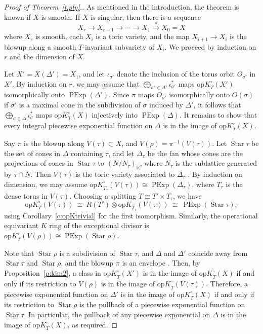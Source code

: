 \documentclass[11pt]{amsart}
\theoremstyle{definition}
\begin{document}
\begin{proof}[Proof of Theorem~\ref{t:plp}.]
As mentioned in the introduction, the theorem is known if $X$ is smooth.  If $X$ is singular, then there is a sequence
\[
  X_r \rightarrow X_{r-1} \rightarrow \cdots \rightarrow X_1  \stackrel{\pi}{\rightarrow} X_0 = X
\]
where $X_r$ is smooth, each $X_i$ is a toric variety, and the map $X_{i + 1} \rightarrow X_i$ is the blowup along a smooth $T$-invariant subvariety of $X_i$.  We proceed by induction on $r$ and the dimension of $X$.

Let $X' = X(\Delta') = X_1$, and let $\iota_{\sigma'}$ denote the inclusion of the torus orbit $O_{\sigma'}$ in $X'$.  By induction on $r$, we may assume that $\bigoplus_{\sigma' \in \Delta'} \iota_{\sigma'}^*$ maps ${\mathrm{op}K}_T^\circ(X')$ isomorphically onto $\operatorname{PExp}(\Delta')$.  Since $\pi$ maps $O_{\sigma'}$ isomorphically onto $O(\sigma)$ if $\sigma'$ is a maximal cone in the subdivision of $\sigma$ induced by $\Delta'$, it follows that $\bigoplus_{\sigma \in \Delta} \iota_\sigma^*$ maps ${\mathrm{op}K}_T^\circ(X)$ injectively into $\operatorname{PExp}(\Delta)$.  It remains to show that every integral piecewise exponential function on $\Delta$ is in the image of ${\mathrm{op}K}_T^\circ(X)$.

Say $\pi$ is the blowup along $V(\tau) \subset X$, and $V(\rho) = \pi^{-1} (V(\tau))$.  Let $\operatorname{Star} \tau$ be the set of cones in $\Delta$ containing $\tau$, and let $\Delta_\tau$ be the fan whose cones are the projections of cones in $\operatorname{Star} \tau$ to $(N / N_\tau)_{\mathbb{R}}$, where $N_\tau$ is the sublattice generated by $\tau \cap N$.  Then $V(\tau)$ is the toric variety associated to $\Delta_\tau$ \cite[Section 3.1]{Fulton}.  By induction on dimension, we may assume ${\mathrm{op}K}_{T_\tau}^\circ(V(\tau)) \cong \operatorname{PExp}(\Delta_\tau)$, where $T_\tau$ is the dense torus in $V(\tau)$.  Choosing a splitting $T \cong T'\times T_\tau$, we have
\[
{\mathrm{op}K}_T^\circ(V(\tau)) \ \cong \ R(T') \otimes {\mathrm{op}K}_{T_\tau}(V(\tau)) \ \cong \ \operatorname{PExp}(\operatorname{Star} \tau),
\]
using Corollary~\ref{c:opKtrivial} for the first isomorphism.  
Similarly, the operational equivariant $K$ ring of the exceptional divisor is ${\mathrm{op}K}_T^\circ(V(\rho)) \cong \operatorname{PExp}(\operatorname{Star} \rho)$.

Note that $\operatorname{Star} \rho$ is a subdivision of $\operatorname{Star} \tau$, and $\Delta$ and $\Delta'$ coincide away from $\operatorname{Star} \tau$ and $\operatorname{Star} \rho$, and the blowup $\pi$ is an envelope \cite[Lemma~1]{chow}.  Then, by Proposition~\ref{p:kim2}, a class in ${\mathrm{op}K}_T^\circ(X')$ is in the image of ${\mathrm{op}K}_T^\circ(X)$ if and only if  its restriction to $V(\rho)$ is in the image of ${\mathrm{op}K}_T^\circ(V(\tau))$.  Therefore, a piecewise exponential function on $\Delta'$ is in the image of ${\mathrm{op}K}_T^\circ(X)$ if and only if its restriction to $\operatorname{Star} \rho$ is the pullback of a piecewise exponential function on $\operatorname{Star} \tau$.  In particular, the pullback of any piecewise exponential on $\Delta$ is in the image of ${\mathrm{op}K}_T^\circ(X)$, as required.
\end{proof}
\end{document}
